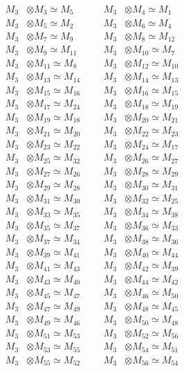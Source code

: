 \begin{align*}
M_{3} &\otimes M_{3} \simeq M_{5} &&& M_{3} &\otimes M_{4} \simeq M_{1}\\
M_{3} &\otimes M_{5} \simeq M_{2} &&& M_{3} &\otimes M_{6} \simeq M_{4}\\
M_{3} &\otimes M_{7} \simeq M_{9} &&& M_{3} &\otimes M_{8} \simeq M_{12}\\
M_{3} &\otimes M_{9} \simeq M_{11} &&& M_{3} &\otimes M_{10} \simeq M_{7}\\
M_{3} &\otimes M_{11} \simeq M_{8} &&& M_{3} &\otimes M_{12} \simeq M_{10}\\
M_{3} &\otimes M_{13} \simeq M_{14} &&& M_{3} &\otimes M_{14} \simeq M_{13}\\
M_{3} &\otimes M_{15} \simeq M_{16} &&& M_{3} &\otimes M_{16} \simeq M_{15}\\
M_{3} &\otimes M_{17} \simeq M_{24} &&& M_{3} &\otimes M_{18} \simeq M_{19}\\
M_{3} &\otimes M_{19} \simeq M_{18} &&& M_{3} &\otimes M_{20} \simeq M_{21}\\
M_{3} &\otimes M_{21} \simeq M_{20} &&& M_{3} &\otimes M_{22} \simeq M_{23}\\
M_{3} &\otimes M_{23} \simeq M_{22} &&& M_{3} &\otimes M_{24} \simeq M_{17}\\
M_{3} &\otimes M_{25} \simeq M_{32} &&& M_{3} &\otimes M_{26} \simeq M_{27}\\
M_{3} &\otimes M_{27} \simeq M_{26} &&& M_{3} &\otimes M_{28} \simeq M_{29}\\
M_{3} &\otimes M_{29} \simeq M_{28} &&& M_{3} &\otimes M_{30} \simeq M_{31}\\
M_{3} &\otimes M_{31} \simeq M_{30} &&& M_{3} &\otimes M_{32} \simeq M_{25}\\
M_{3} &\otimes M_{33} \simeq M_{35} &&& M_{3} &\otimes M_{34} \simeq M_{38}\\
M_{3} &\otimes M_{35} \simeq M_{37} &&& M_{3} &\otimes M_{36} \simeq M_{33}\\
M_{3} &\otimes M_{37} \simeq M_{34} &&& M_{3} &\otimes M_{38} \simeq M_{36}\\
M_{3} &\otimes M_{39} \simeq M_{41} &&& M_{3} &\otimes M_{40} \simeq M_{44}\\
M_{3} &\otimes M_{41} \simeq M_{43} &&& M_{3} &\otimes M_{42} \simeq M_{39}\\
M_{3} &\otimes M_{43} \simeq M_{40} &&& M_{3} &\otimes M_{44} \simeq M_{42}\\
M_{3} &\otimes M_{45} \simeq M_{47} &&& M_{3} &\otimes M_{46} \simeq M_{50}\\
M_{3} &\otimes M_{47} \simeq M_{49} &&& M_{3} &\otimes M_{48} \simeq M_{45}\\
M_{3} &\otimes M_{49} \simeq M_{46} &&& M_{3} &\otimes M_{50} \simeq M_{48}\\
M_{3} &\otimes M_{51} \simeq M_{53} &&& M_{3} &\otimes M_{52} \simeq M_{56}\\
M_{3} &\otimes M_{53} \simeq M_{55} &&& M_{3} &\otimes M_{54} \simeq M_{51}\\
M_{3} &\otimes M_{55} \simeq M_{52} &&& M_{3} &\otimes M_{56} \simeq M_{54}\\
\end{align*}

